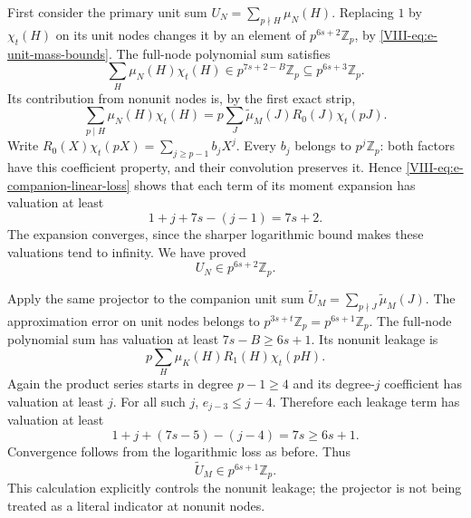 \documentclass[11pt,letterpaper]{article}
\numberwithin{equation}{section}
\begin{document}
First consider the primary unit sum
$U_N=\sum_{p\nmid H}\mu_N(H)$.
Replacing $1$ by $\chi_t(H)$ on its unit nodes changes it by an
element of $p^{6s+2}\mathbb Z_p$, by
\eqref{VIII-eq:e-unit-mass-bounds}. The full-node polynomial sum satisfies
\[
 \sum_H\mu_N(H)\chi_t(H)\in p^{7s+2-B}\mathbb Z_p
                              \subseteq p^{6s+3}\mathbb Z_p.
\]
Its contribution from nonunit nodes is, by the first exact strip,
\[
 \sum_{p\mid H}\mu_N(H)\chi_t(H)
   =p\sum_J\widetilde\mu_M(J)R_0(J)\chi_t(pJ).
\]
Write $R_0(X)\chi_t(pX)=\sum_{j\ge p-1}b_jX^j$.
Every $b_j$ belongs to $p^j\mathbb Z_p$: both factors have this
coefficient property, and their convolution preserves it. Hence
\eqref{VIII-eq:e-companion-linear-loss} shows that each term of its
moment expansion has valuation at least
\[
 1+j+7s-(j-1)=7s+2.
\]
The expansion converges, since the sharper logarithmic bound makes
these valuations tend to infinity. We have proved
\begin{equation}\label{VIII-eq:e-primary-unit-sum}
 U_N\in p^{6s+2}\mathbb Z_p.
\end{equation}

Apply the same projector to the companion unit sum
$\widetilde U_M=\sum_{p\nmid J}\widetilde\mu_M(J)$.
The approximation error on unit nodes belongs to
$p^{3s+t}\mathbb Z_p=p^{6s+1}\mathbb Z_p$.
The full-node polynomial sum has valuation at least
$7s-B\ge6s+1$. Its nonunit leakage is
\[
 p\sum_H\mu_K(H)R_1(H)\chi_t(pH).
\]
Again the product series starts in degree $p-1\ge4$ and its
degree-$j$ coefficient has valuation at least $j$.
For all such $j$, $e_{j-3}\le j-4$. Therefore each leakage term has
valuation at least
\[
 1+j+(7s-5)-(j-4)=7s\ge6s+1.
\]
Convergence follows from the logarithmic loss as before. Thus
\begin{equation}\label{VIII-eq:e-companion-unit-sum}
 \widetilde U_M\in p^{6s+1}\mathbb Z_p.
\end{equation}
This calculation explicitly controls the nonunit leakage; the projector
is not being treated as a literal indicator at nonunit nodes.
\end{document}
